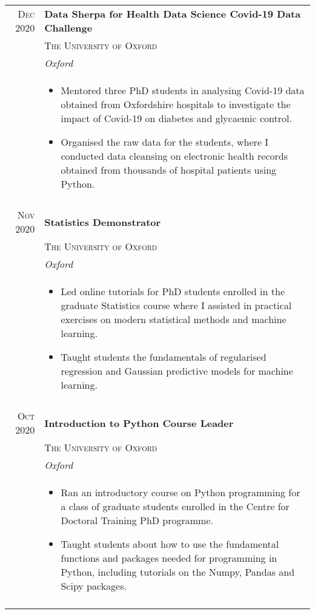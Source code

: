 \documentclass[a4paper,10pt]{article}
\begin{document}
\begin{longtable}{rl}
\textsc{Dec} 2020
& \large{\textbf{Data Sherpa for Health Data Science Covid-19 Data Challenge}}\\
& \textsc{The University of Oxford}\\
& \textit{Oxford} \\
&\begin{minipage}[t]{0.8\textwidth}
 \begin{itemize}[leftmargin=*]
 \item Mentored three PhD students in analysing Covid-19 data obtained from Oxfordshire hospitals to investigate the impact of Covid-19 on diabetes and glycaemic control.
 \item Organised the raw data for the students, where I conducted data cleansing on electronic health records obtained from thousands of hospital patients using Python.
\end{itemize}
\end{minipage}\\&\\

\textsc{Nov} 2020
& \large{\textbf{Statistics Demonstrator}}\\
& \textsc{The University of Oxford}\\
& \textit{Oxford} \\
&\begin{minipage}[t]{0.8\textwidth}
 \begin{itemize}[leftmargin=*]
 \item Led online tutorials for PhD students enrolled in the graduate Statistics course where I assisted in practical exercises on modern statistical methods and machine learning.
 \item Taught students the fundamentals of regularised regression and Gaussian predictive models for machine learning. 
\end{itemize}
\end{minipage}\\&\\

\textsc{Oct} 2020
& \large{\textbf{Introduction to Python Course Leader}}\\
& \textsc{The University of Oxford}\\
& \textit{Oxford} \\
&\begin{minipage}[t]{0.8\textwidth}
 \begin{itemize}[leftmargin=*]
 \item Ran an introductory course on Python programming for a class of graduate students enrolled in the Centre for Doctoral Training PhD programme.
 \item Taught students about how to use the fundamental functions and packages needed for programming in Python, including tutorials on the Numpy, Pandas and Scipy packages. 
\end{itemize}
\end{minipage}\\&\\


\end{longtable}
\end{document}

